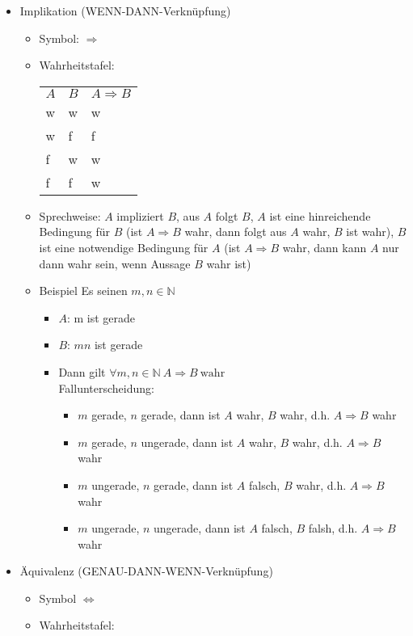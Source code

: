 \documentclass[a4paper]{scrartcl}
\DeclareMathOperator{\Forall}{\forall}
\begin{document}
\begin{itemize}
\item Implikation (WENN-DANN-Verknüpfung)
\begin{itemize}
\item Symbol: $\Rightarrow$
\item Wahrheitstafel:
\begin{center}
\begin{tabular}{lll}
$A$ & $B$ & $A\Rightarrow B$\\
w & w & w\\
w & f & f\\
f & w & w\\
f & f & w\\
\end{tabular}
\end{center}
\item Sprechweise: $A$ impliziert $B$, aus $A$ folgt $B$, $A$ ist eine hinreichende Bedingung für $B$ (ist $A\Rightarrow B$ wahr, dann folgt aus $A$ wahr, $B$ ist wahr), $B$ ist eine notwendige Bedingung für $A$ (ist $A\Rightarrow B$ wahr, dann kann $A$ nur dann wahr sein, wenn Aussage $B$ wahr ist)
\item Beispiel Es seinen $m,n\in\mathbb{N}$
\begin{itemize}
\item $A$: m ist gerade
\item $B$: $mn$ ist gerade
\item Dann gilt $\Forall m,n \in\mathbb{N}~A\Rightarrow B~\text{wahr}$ \\
         Fallunterscheidung:
\begin{itemize}
\item $m$ gerade, $n$ gerade, dann ist $A$ wahr, $B$ wahr, d.h. $A\Rightarrow B$ wahr
\item $m$ gerade, $n$ ungerade, dann ist $A$ wahr, $B$ wahr, d.h. $A\Rightarrow B$ wahr
\item $m$ ungerade, $n$ gerade, dann ist $A$ falsch, $B$ wahr, d.h. $A\Rightarrow B$ wahr
\item $m$ ungerade, $n$ ungerade, dann ist $A$ falsch, $B$ falsh, d.h. $A\Rightarrow B$ wahr
\end{itemize}
\end{itemize}
\end{itemize}
\item Äquivalenz (GENAU-DANN-WENN-Verknüpfung)
\begin{itemize}
\item Symbol $\Leftrightarrow$
\item Wahrheitstafel:
\begin{center}

\end{center}
\end{itemize}
\end{itemize}
\end{document}
